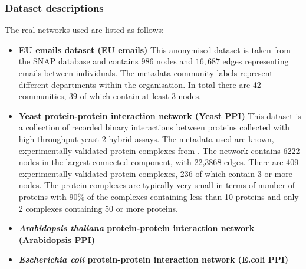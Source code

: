 \documentclass[sigconf]{acmart}
\begin{document}
\subsubsection{Dataset descriptions}
\label{sec:real_network_descs}
The real networks used are listed as follows:
\begin{itemize}
 \item \textbf{EU emails dataset (EU emails)} This anonymised dataset is taken from the SNAP database \cite{snap} and contains $986$ nodes and $16,687$ edges representing emails between individuals.
 The metadata community labels represent different departments within the organisation.
 In total there are 42 communities, 39 of which contain at least 3 nodes.
 
 \item \textbf{Yeast protein-protein interaction network (Yeast PPI)} \cite{yu2008high}
 This dataset is a collection of recorded binary interactions between proteins collected with high-throughput yeast-2-hybrid assays.
 The metadata used are known, experimentally validated protein complexes from \cite{pu2008up}.
 The network contains 6222 nodes in the largest connected component, with 22,3868 edges.
 There are 409 experimentally validated protein complexes, 236 of which contain 3 or more nodes.
 The protein complexes are typically very small in terms of number of proteins with  90\% of the complexes containing less than 10 proteins and only 2 complexes containing 50 or more proteins.
 
 \item \textbf{\textit{Arabidopsis thaliana} protein-protein interaction network (Arabidopsis PPI)} \cite{ArabidopsisConsortium2011}
 
 \item \textbf{\textit{Escherichia coli} protein-protein interaction network (E.coli PPI)}
 
\end{itemize}
\end{document}
